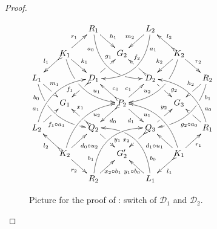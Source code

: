 \documentclass[a4paper,UKenglish,cleveref,pdftex,thm-restate,numberwithinsect,anonymous]{lipics}
\newcommand{\dder}[1]{\mathscr{#1}}
\begin{document}
\begin{proof}
	
	\begin{figure}[t]
		\centering 
		$\xymatrix@C=15pt@R=15pt{&&R_1 \ar@/_.8cm/[ddrr]_(.2){a_0}|(.7)\hole
			\ar[dr]^{h_1}&& L_2\ar@/^.8cm/[ddll]^(.2){a_1}
			\ar[dl]_{m_2}\\&K_1\ar[dr]^{k_1}\ar@{>->}[dl]_{l_1}
			\ar@/_.6cm/[ddrr]|(.36)\hole^(.65){u_1}\ar[ur]^{r_1}&& G_2 &&
			K_2
			\ar@/^.6cm/[ddll]|(.36)\hole_(.65){u_2}\ar[dl]_{k_2}\ar@{>->}[lu]_{l_2}
			\ar[dr]^{r_2}\\L_1
			\ar@/_.6cm/[ddrr]_(.2){b_0}|(.31)\hole|(.81)\hole
			\ar[dr]^(.4){m_1}|(.61)\hole && D_1
			\ar@{>->}[dl]|(.4)\hole_(.65){f_1}\ar[ur]|(.5)\hole^(.7){g_1}&&D_2
			\ar[dr]|(.4)\hole^(.65){g_2}
			\ar@{>->}[ul]|(.5)\hole_(.65){f_2}&&R_2\ar@/^.6cm/[ddll]^(.2){b_1}|(.31)\hole|(.81)\hole\ar[dl]_(.4){h_2}|(.61)\hole\\&G_1
			&&P_2\ar[dr]_{d_1}
			\ar@{>->}[dl]^{d_0}\ar[ur]^(.4){c_1}\ar@{>->}[ul]_(.4){c_0}&&G_3\\L_2
			\ar@/^.6cm/[uurr]^(.2){a_1} \ar[ur]_(.35){f_1\circ
				a_1}|(.61)\hole&&Q_2
			\ar@{>->}[ul]|(.4)\hole_(.65){x_1}\ar[dr]|(.5)\hole^(.65){y_1}
			&&Q_3\ar[ur]|(.4)\hole^(.65){y_2} \ar@{>->}[dl]|(.5)\hole_(.65){x_2}
			&& R_1 \ar[ul]^(.3){g_2\circ
				a_0}|(.61)\hole\ar@/_.6cm/[uull]_(.2){a_0}\\&K_2
			\ar[ur]_{d_0\circ u_2} \ar[dr]_{r_2}
			\ar@{>->}[ul]^{l_2}\ar@/^.6cm/[uurr]_(.65){u_2}&&G'_2&& K_1
			\ar[ur]_{r_1} \ar[ul]^{d_1\circ u_1} \ar@{>->}[dl]^{l_1}
			\ar@/_.6cm/[uull]^(.65){u_1}\\&& R_2
			\ar[ur]_{\hspace{-6pt}x_2\circ
				b_1}\ar@/^.8cm/[uurr]^(.2){b_1}&& L_1 \ar[ul]^{y_1\circ
				b_0\hspace{-7pt}} \ar@/_.8cm/[uull]_(.2){b_0} |(.69)\hole
		}	$		
		\caption{Picture for the proof of : switch of $\dder{D}_1$ and $\dder{D}_2$.}
		\label{fi:second}
	\end{figure}
	

\end{proof}
\end{document}
